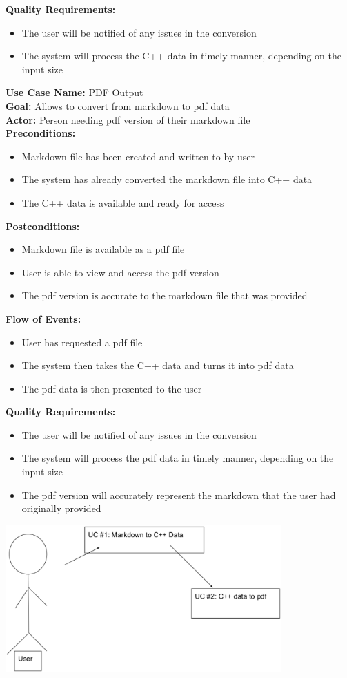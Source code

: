 \textbf{Quality Requirements:} 
\begin{itemize}
\item The user will be notified of any issues in the conversion
\item The system will process the C++ data in timely manner, depending on the input size 
\end{itemize}
\textbf{Use Case Name:} PDF Output  
\\
\textbf{Goal:} Allows to convert from markdown to pdf data
\\
\textbf{Actor:} Person needing pdf version of their markdown file
\\
\textbf{Preconditions:} 
\begin{itemize}
\item Markdown file has been created and written to by user 
\item The system has already converted the markdown file into C++ data
\item The C++ data is available and ready for access 
\end{itemize}
\textbf{Postconditions:} 
\begin{itemize}
\item Markdown file is available as a pdf file 
\item User is able to view and access the pdf version
\item The pdf version is accurate to the markdown file that was provided 
\end{itemize}
\textbf{Flow of Events:} 
\begin{itemize} 
\item User has requested a pdf file
\item The system then takes the C++ data and turns it into pdf data 
\item The pdf data is then presented to the user 
\end{itemize}
\textbf{Quality Requirements:} 
\begin{itemize}
\item The user will be notified of any issues in the conversion
\item The system will process the pdf data in timely manner, depending on the input size 
\item The pdf version will accurately represent the markdown that the user had originally provided
\end{itemize} 

\includegraphics[width=300pt]{images/useCase.eps}
